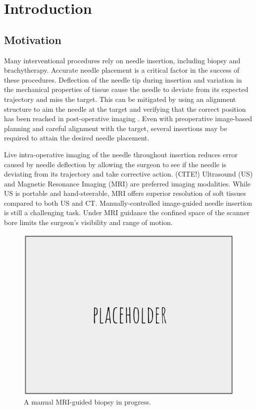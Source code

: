 \chapter{Introduction}
\label{sec:intro} %
\section{Motivation}
Many interventional procedures rely on needle insertion, including biopsy and brachytherapy\cite{bomers_mri-guided_2012}. Accurate needle placement is a critical factor in the success of these procedures\cite{nath_dosimetric_2000, youk_missed_2007}. Deflection of the needle tip during insertion and variation in the mechanical properties of tissue cause the needle to deviate from its expected trajectory and miss the target. This can be mitigated by using an alignment structure to aim the needle at the target and verifying that the correct position has been reached in post-operative imaging \cite{tokuda_-bore_2012}. Even with preoperative image-based planning and careful alignment with the target, several insertions may be required to attain the desired needle placement\cite{onik_ct-guided_1988}. 

Live intra-operative imaging of the needle throughout insertion reduces error caused by needle deflection by allowing the surgeon to see if the needle is deviating from its trajectory and take corrective action. (CITE!) Ultrasound (US) and Magnetic Resonance Imaging (MRI) are preferred imaging modalities. While US is portable and hand-steerable, MRI offers superior resolution of soft tissues compared to both US and CT\cite{weiss_mr-guided_2008}. Manually-controlled image-guided needle insertion is still a challenging task. Under MRI guidance the confined space of the scanner bore limits the surgeon's visibility and range of motion\cite{damico_transperineal_2000, menard_mri_nodate}.

\begin{figure}[h]
\includegraphics[width=1.0\textwidth]{Fig/placeholder.png}
\caption{A manual MRI-guided biopsy in progress.}
\label{fig:mri_intraoperative}
\end{figure}

